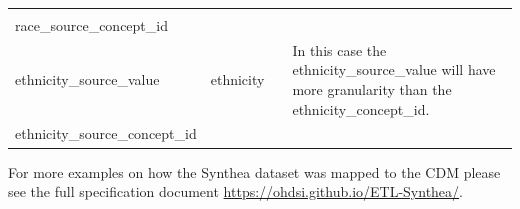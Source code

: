 \documentclass[11pt]{book}
\theoremstyle{definition}
\theoremstyle{definition}
\theoremstyle{definition}
\theoremstyle{remark}
\begin{document}
\begin{longtable}[]{@{}llll@{}}
\begin{minipage}[t]{0.12\columnwidth}
\strut
\end{minipage} & \begin{minipage}[t]{0.42\columnwidth}\raggedright
\strut
\end{minipage}\tabularnewline
\begin{minipage}[t]{0.24\columnwidth}\raggedright
race\_source\_concept\_id\strut
\end{minipage} & \begin{minipage}[t]{0.10\columnwidth}\raggedright
\strut
\end{minipage} & \begin{minipage}[t]{0.12\columnwidth}\raggedright
\strut
\end{minipage} & \begin{minipage}[t]{0.42\columnwidth}\raggedright
\strut
\end{minipage}\tabularnewline
\begin{minipage}[t]{0.24\columnwidth}\raggedright
ethnicity\_source\_value\strut
\end{minipage} & \begin{minipage}[t]{0.10\columnwidth}\raggedright
ethnicity\strut
\end{minipage} & \begin{minipage}[t]{0.12\columnwidth}\raggedright
\strut
\end{minipage} & \begin{minipage}[t]{0.42\columnwidth}\raggedright
In this case the ethnicity\_source\_value will have more granularity than the ethnicity\_concept\_id.\strut
\end{minipage}\tabularnewline
\begin{minipage}[t]{0.24\columnwidth}\raggedright
ethnicity\_source\_concept\_id\strut
\end{minipage} & \begin{minipage}[t]{0.10\columnwidth}\raggedright
\strut
\end{minipage} & \begin{minipage}[t]{0.12\columnwidth}\raggedright
\strut
\end{minipage} & \begin{minipage}[t]{0.42\columnwidth}\raggedright
\strut
\end{minipage}\tabularnewline
\bottomrule
\end{longtable}

For more examples on how the Synthea dataset was mapped to the CDM please see the full specification document \url{https://ohdsi.github.io/ETL-Synthea/}.
\end{document}
